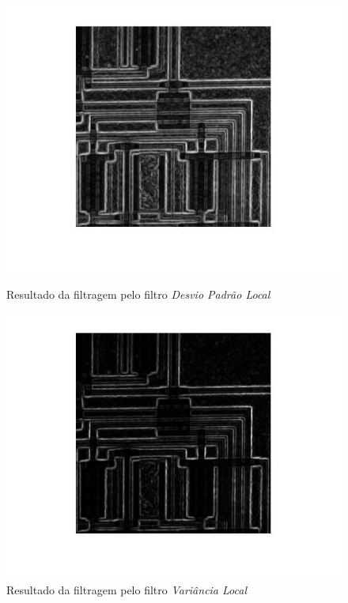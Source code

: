 \begin{figure}[!h]
  \centering
  \begin{minipage}[b]{0.4\textwidth}
    \includegraphics[width=\textwidth]{img/stdfilt_std}
    \caption{Resultado da filtragem pelo filtro \textit{Desvio Padrão Local}}\label{fig:stdfilt:std}
  \end{minipage}
  \hfill
  \begin{minipage}[b]{0.4\textwidth}
    \includegraphics[width=\textwidth]{img/stdfilt_var}
    \caption{Resultado da filtragem pelo filtro \textit{Variância Local}}\label{fig:stdfilt:var}
  \end{minipage}
\end{figure}


